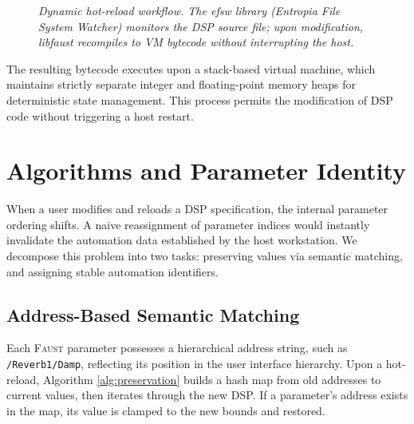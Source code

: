 \documentclass[twoside,a4paper]{article}
\newcommand{\F}{\textsc{Faust}}
\begin{document}
\begin{figure}[ht]
\centering
{}
\caption{\label{fig:dynamic_workflow}{\it Dynamic hot-reload workflow. The efsw library (Entropia File System Watcher) monitors the DSP source file; upon modification, libfaust recompiles to VM bytecode without interrupting the host.}}
\end{figure}

The resulting bytecode executes upon a stack-based virtual machine, which maintains strictly separate integer and floating-point memory heaps for deterministic state management. This process permits the modification of DSP code without triggering a host restart.

\section{Algorithms and Parameter Identity}
\label{sec:algorithms}

When a user modifies and reloads a DSP specification, the internal parameter ordering shifts. A naive reassignment of parameter indices would instantly invalidate the automation data established by the host workstation. We decompose this problem into two tasks: preserving values via semantic matching, and assigning stable automation identifiers.

\subsection{Address-Based Semantic Matching}

Each \F{} parameter possesses a hierarchical address string, such as \texttt{/Reverb1/Damp}, reflecting its position in the user interface hierarchy. Upon a hot-reload, Algorithm \ref{alg:preservation} builds a hash map from old addresses to current values, then iterates through the new DSP. If a parameter's address exists in the map, its value is clamped to the new bounds and restored.
\end{document}

